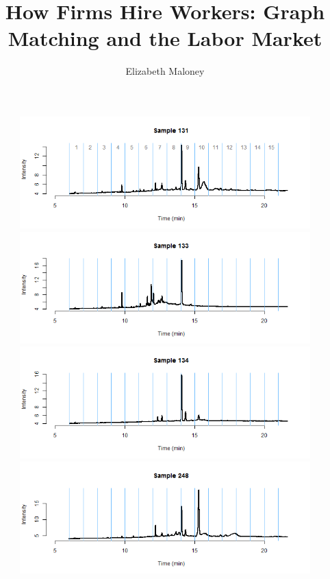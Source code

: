\documentclass[11pt]{article}
\theoremstyle{plain}
\theoremstyle{definition}
\begin{document}
 

\title{How Firms Hire Workers: Graph Matching and the Labor Market}
\author{Elizabeth Maloney}
\begin{figure}[H]
\begin{center}
\includegraphics[trim ={3.5cm 2.7cm 2cm 2cm},scale=.6, clip=true]{BinPlotDMC_13.png}
\includegraphics[trim ={3.5cm 2.7cm 2cm 2cm},scale=.6, clip=true]{BinPlotDMC_14.png}
\includegraphics[trim ={3.5cm 2.7cm 2cm 2cm},scale=.6, clip=true]{BinPlotDMC_15.png}
\includegraphics[trim ={3.5cm 2.7cm 2cm 2cm},scale=.6, clip=true]{BinPlotDMC_16.png}

\end{center}
\end{figure}
\end{document}
